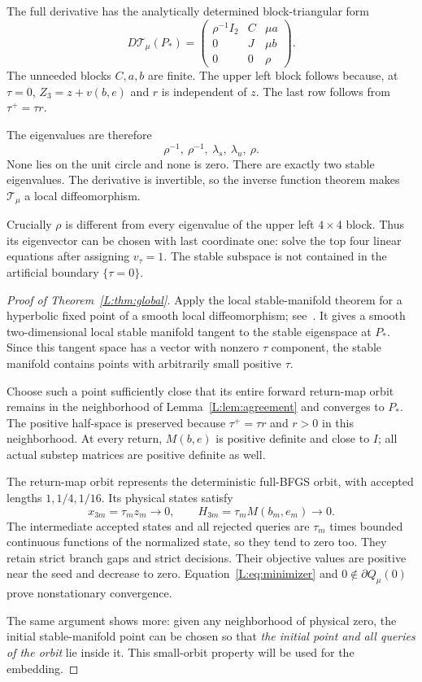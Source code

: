 The full derivative has the analytically determined block-triangular form
\begin{equation}\label{L:eq:jacobian}
 D\mathcal T_\mu(P_*)=
 \begin{pmatrix}
 \rho^{-1}I_2&C&\mu a\\
 0&J&\mu b\\
 0&0&\rho
 \end{pmatrix}.
\end{equation}
The unneeded blocks $C,a,b$ are finite. The upper left block follows because, at $\tau=0$, $Z_3=z+v(b,e)$ and $r$ is independent of $z$. The last row follows from $\tau^+=\tau r$.

The eigenvalues are therefore
\[
 \rho^{-1},\ \rho^{-1},\ \lambda_s,\ \lambda_u,\ \rho.
\]
None lies on the unit circle and none is zero. There are exactly two stable eigenvalues. The derivative is invertible, so the inverse function theorem makes $\mathcal T_\mu$ a local diffeomorphism.

Crucially $\rho$ is different from every eigenvalue of the upper left $4\times4$ block. Thus its eigenvector can be chosen with last coordinate one: solve the top four linear equations after assigning $v_\tau=1$. The stable subspace is not contained in the artificial boundary $\{\tau=0\}$.

\begin{proof}[Proof of Theorem~\ref{L:thm:global}]
Apply the local stable-manifold theorem for a hyperbolic fixed point of a smooth local diffeomorphism; see~\cite[Sections 3--4]{DY}. It gives a smooth two-dimensional local stable manifold tangent to the stable eigenspace at $P_*$. Since this tangent space has a vector with nonzero $\tau$ component, the stable manifold contains points with arbitrarily small positive $\tau$.

Choose such a point sufficiently close that its entire forward return-map orbit remains in the neighborhood of Lemma~\ref{L:lem:agreement} and converges to $P_*$. The positive half-space is preserved because $\tau^+=\tau r$ and $r>0$ in this neighborhood. At every return, $M(b,e)$ is positive definite and close to $I$; all actual substep matrices are positive definite as well.

The return-map orbit represents the deterministic full-BFGS orbit, with accepted lengths $1,1/4,1/16$. Its physical states satisfy
\[
 x_{3m}=\tau_m z_m\to0,\qquad H_{3m}=\tau_mM(b_m,e_m)\to0.
\]
The intermediate accepted states and all rejected queries are $\tau_m$ times bounded continuous functions of the normalized state, so they tend to zero too. They retain strict branch gaps and strict decisions. Their objective values are positive near the seed and decrease to zero. Equation~\eqref{L:eq:minimizer} and $0\notin\partial Q_\mu(0)$ prove nonstationary convergence.

The same argument shows more: given any neighborhood of physical zero, the initial stable-manifold point can be chosen so that \emph{the initial point and all queries of the orbit} lie inside it. This small-orbit property will be used for the embedding.
\end{proof}


